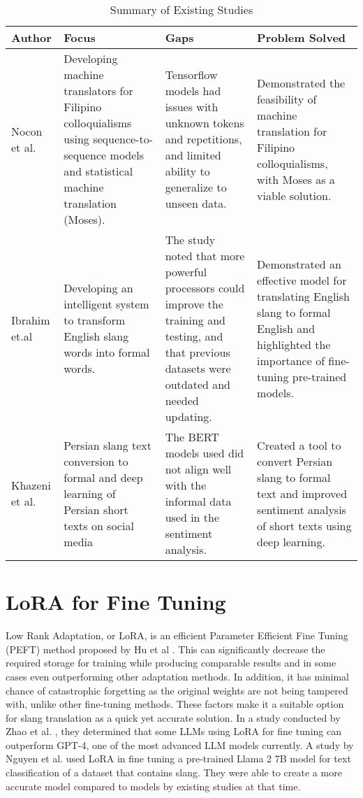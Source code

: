 \begin{table}[ht]  
    \centering
    \caption{Summary of Existing Studies} \vspace{0.25em}
    \begin{tabular}{|p{1in}|p{1in}|p{1in} | p{1in}|} \hline
    \centering Author
    & Focus 
    & Gaps 
    & Problem Solved  \\ \hline
    
    Nocon et al.    
    & Developing machine translators for Filipino colloquialisms using sequence-to-sequence models and statistical machine translation (Moses). & Tensorflow models had issues with unknown tokens and repetitions, and limited ability to generalize to unseen data.
    & Demonstrated the feasibility of machine translation for Filipino colloquialisms, with Moses as a viable solution.
    \\ \hline
    
    Ibrahim et.al  
    & Developing an intelligent system to transform English slang words into formal words.
    & The study noted that more powerful processors could improve the training and testing, and that previous datasets were outdated and needed updating.
    & Demonstrated an effective model for translating English slang to formal English and highlighted the importance of fine-tuning pre-trained models.
    \\ \hline
    
    Khazeni et al.
    & Persian slang text conversion to formal and deep learning of Persian short texts on social media
    & The BERT models used did not align well with the informal data used in the sentiment analysis.
    & Created a tool to convert Persian slang to formal text and improved sentiment analysis of short texts using deep learning.
    \\ \hline
    
    \end{tabular}
    \label{tab:timetableactivities}
    \end{table}

\section{LoRA for Fine Tuning}
Low Rank Adaptation, or LoRA, is an efficient Parameter Efficient Fine Tuning (PEFT) method proposed by Hu et al \cite{hu2021loralowrankadaptationlarge}.
This can significantly decrease the required storage for training while producing comparable results and in some cases even outperforming other adaptation methods.
In addition, it has minimal chance of catastrophic forgetting as the original weights are not being tampered with, unlike other fine-tuning methods.
These factors make it a suitable option for slang translation as a quick yet accurate solution.
In a study conducted by Zhao et al. \cite{zhao2024loraland310finetuned}, they determined that some LLMs using LoRA for fine tuning can outperform GPT-4, one of the most advanced LLM models currently.
A study by Nguyen et al. \cite{nguyen2023finetuningllama2large} used LoRA in fine tuning a pre-trained Llama 2 7B model for text classification of a dataset that contains slang.
They were able to create a more accurate model compared to models by existing studies at that time. 

